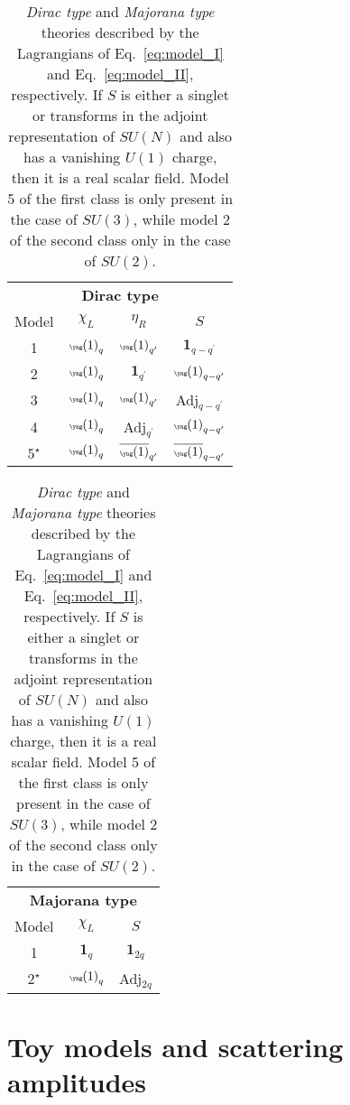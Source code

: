 \documentclass[a4paper,11pt]{article}
\begin{document}
\begin{table}[t]
\begin{center}
\begin{tabular}[t]{ c | c  | c  | c    }
 \multicolumn{4}{c}{{\bf Dirac type}}\\
Model & $\chi_L$ & $\eta_R$ & $S$ \\
\hline
1& ${\tiny{\yng(1)}}_q$ & ${\tiny{\yng(1)}}_{q^\prime}$ & $\mathbf{1}_{q-q^\prime}$  \\
%
2 & ${\tiny{\yng(1)}}_q$ & $\mathbf{1}_{q^\prime}$ & ${\tiny{\yng(1)}}_{q-q^\prime}$    \\
%
3& ${\tiny{\yng(1)}}_q$ & ${\tiny{\yng(1)}}_{q^\prime}$ & Adj$_{q-q^\prime}$    \\
%
4& ${\tiny{\yng(1)}}_q$ & Adj$_{q^\prime}$ & ${\tiny{\yng(1)}}_{q-q^\prime}$    \\
$5^\star$ & ${\tiny{\yng(1)}}_q$ & $\overline {\tiny{\yng(1)}}_{q^\prime}$ & $\overline {\tiny{\yng(1)}}_{q-q^\prime}$
\end{tabular}  
%
\hspace{2cm}
%
\begin{tabular}[t]{ c | c    | c }
 \multicolumn{3}{c}{{\bf Majorana type}}\\
Model & $\chi_L$ &  $S$  \\
\hline
1& ${\mathbf 1}_q$  & ${\mathbf 1}_{2q}$   \\
$2^\star$& ${\tiny{\yng(1)}}_q$  & Adj$_{2q}$ \\
\end{tabular}  
\end{center}
\caption{{\emph{Dirac type}} and {\emph{Majorana  type}} theories described by the Lagrangians of Eq.~\eqref{eq:model_I} and Eq.~\eqref{eq:model_II}, respectively. If $S$ is either a singlet or transforms in the adjoint representation of $SU(N)$ and also has a vanishing $U(1)$ charge, then it is a real scalar field. Model 5 of the first class is only present in the case of $SU(3)$, while model 2 of the second class only in the case of $SU(2)$.}
\label{tab:models}
\end{table}



\section{Toy models and scattering amplitudes}\label{sec:toy}
\end{document}
